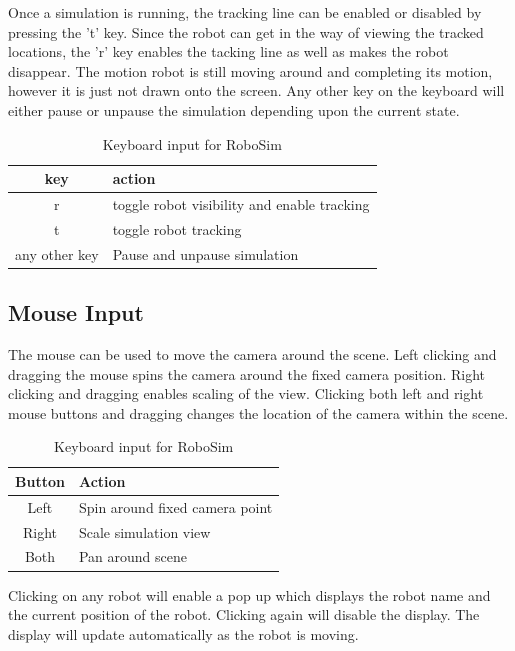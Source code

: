 \documentclass{article}
\begin{document}
Once a simulation is running, the tracking line can be enabled or
disabled by pressing the 't' key.  Since the robot can get in the way of viewing
the tracked locations, the 'r' key enables the tacking line as well as makes the
robot disappear.  The motion robot is still moving around and completing its
motion, however it is just not drawn onto the screen.  Any other key on the
keyboard will either pause or unpause the simulation depending upon the current
state.
\begin{table}[H]
	\begin{center}
	\begin{tabular}{c | l }
		\hline \hline
		\textbf{key} & \textbf{action} \\ \hline
		r & toggle robot visibility and enable tracking \\
		t & toggle robot tracking \\
		any other key & Pause and unpause simulation \\
		\hline \hline
	\end{tabular}
	\caption{Keyboard input for RoboSim}
	\label{tab:keys}
	\end{center}
\end{table}

\subsection{Mouse Input}
The mouse can be used to move the camera around the scene.  Left clicking and
dragging the mouse spins the camera around the fixed camera position.  Right
clicking and dragging enables scaling of the view.  Clicking both left and right
mouse buttons and dragging changes the location of the camera within the scene.
\begin{table}[H]
	\begin{center}
	\begin{tabular}{c | l }
		\hline \hline
		\textbf{Button} & \textbf{Action} \\ \hline
		Left & Spin around fixed camera point \\
		Right & Scale simulation view \\
		Both & Pan around scene \\
		\hline \hline
	\end{tabular}
	\caption{Keyboard input for RoboSim}
	\label{tab:mouse}
	\end{center}
\end{table}

Clicking on any robot will enable a pop up which displays the robot name and the
current position of the robot.  Clicking again will disable the display.  The
display will update automatically as the robot is moving.
\end{document}

